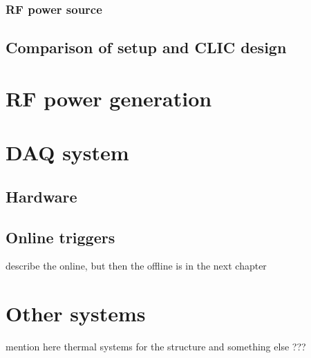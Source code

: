 \subsubsection{RF power source}




\subsection[Comparison of setup and CLIC design]{Comparison of setup and CLIC design}



\section[RF power generation]{RF power generation}



\section[DAQ system]{DAQ system}

\subsection[Hardware]{Hardware}

\subsection[Online triggers]{Online triggers}

describe the online, but then the offline is in the next chapter

\section[Other systems]{Other systems}

mention here thermal systems for the structure and something else ???

